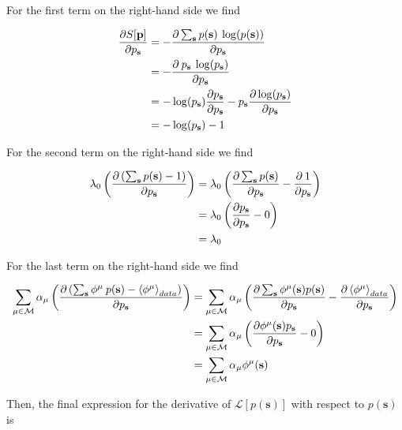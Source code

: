 \noindent
For the first term on the right-hand side we find

\begin{align*}
    \frac{\partial S[\mathbf{p}]}{\partial p_\mathbf{s}} &= - \frac{\partial \sum_{\mathbf{s}} p(\mathbf{s}) \: \log(p(\mathbf{s}))}{\partial p_\mathbf{s}}\\
    &= - \frac{\partial \: p_{\mathbf{s}} \: \log(p_{\mathbf{s}})}{\partial p_\mathbf{s}} \\
    &= - \log(p_{\mathbf{s}}) \frac{\partial p_\mathbf{s}}{\partial p_\mathbf{s}} - p_\mathbf{s} \frac{\partial \log(p_\mathbf{s})}{\partial p_\mathbf{s}} \\
    &= - \log(p_{\mathbf{s}}) - 1 \notag
\end{align*}

\noindent
For the second term on the right-hand side we find

\begin{align*}
    \lambda_0 \left( \frac{\partial \left( \sum_{\mathbf{s}} p(\mathbf{s}) - 1 \right)}{\partial p_\mathbf{s}}\right) &= \lambda_0 \left( \frac{\partial \sum_{\mathbf{s}} p(\mathbf{s})}{\partial p_\mathbf{s}} -  \frac{\partial \: 1}{{\partial p_\mathbf{s}}}\right) \\
    &= \lambda_0 \left(\frac{\partial p_\mathbf{s}}{\partial p_\mathbf{s}} - 0 \right) \\
    &= \lambda_0 \notag
\end{align*}

\noindent
For the last term on the right-hand side we find

\begin{align*}
    \sum_{\mu \in \mathcal{M}} \alpha_\mu \left( \frac{\partial \left( \sum_{\mathbf{s}} \phi^\mu \: p(\mathbf{s}) - \expval{\phi^\mu}_{data} \right)}{\partial p_\mathbf{s}} \right) &= \sum_{\mu \in \mathcal{M}} \alpha_\mu \left( \frac{\partial \sum_{\mathbf{s}} \phi^\mu(\mathbf{s}) p(\mathbf{s})}{\partial p_\mathbf{s}} - \frac{\partial \expval{\phi^\mu}_{data}}{\partial p_\mathbf{s}} \right)\\
    &= \sum_{\mu \in \mathcal{M}} \alpha_\mu \left( \frac{\partial \phi^\mu(\mathbf{s}) p_{\mathbf{s}}}{\partial p_\mathbf{s}} - 0\right) \\
    &= \sum_{\mu \in \mathcal{M}} \alpha_\mu \phi^\mu(\mathbf{s})
\end{align*}

\noindent
Then, the final expression for the derivative of $\mathcal{L}[p(\mathbf{s})]$ with respect to $p(\mathbf{s})$ is

